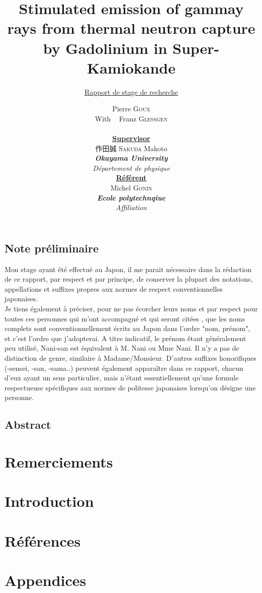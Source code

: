 \documentclass[a4paper,10pt,twoside]{article}
\title{
Stimulated emission of gammay rays from thermal neutron capture by Gadolinium in Super-Kamiokande
}
\subtitle{\underline{Rapport de stage de recherche}}
\author{Pierre \textsc{Goux}\\
\vspace{1em}
With ~ Franz \textsc{Glessgen}\\
\begin{multicols}{2}
\underline{\textbf{\small{Supervisor}}}\\ 作田誠 \textsc{Sakuda} Makoto\\ \textit{\textbf{Okayama University}}\\\textit{ Département de physique}\\
\underline{\textbf{\small{Référent}}}\\ 
Michel \textsc{Gonin}\\ \textit{\textbf{Ecole polytechnqiue}}\\\textit{Affiliation}
\end{multicols}
}
\begin{document}
\maketitle


\subsection*{Note préliminaire}

Mon stage ayant été effectué au Japon, il me parait nécessaire dans la rédaction de ce rapport, par respect et par principe, de conserver la plupart des notations, appellations et suffixes propres aux normes de respect conventionnelles japonaises. \\

Je tiens également à préciser, pour ne pas écorcher leurs noms et par respect pour toutes ces personnes qui m'ont accompagné et qui seront citées , que les noms complets sont conventionnellement écrits au Japon dans l'ordre "nom, prénom", et c'est l'ordre que j'adopterai. 
A titre indicatif, le prénom étant généralement peu utilisé, Nani-san est équivalent à M. Nani ou Mme Nani. Il n'y a pas de distinction de genre, similaire à Madame/Monsieur. D'autres suffixes honorifiques (-sensei, -san, -sama..) peuvent également apparaître dans ce rapport, chacun d'eux ayant un sens particulier, mais n'étant essentiellement qu'une formule respectueuse spécifiques aux normes de politesse japonaises lorsqu'on désigne une personne.\\

\subsection*{Abstract}



\section*{Remerciements}


\newpage
\section*{Introduction}


\tableofcontents


%
%



\listoffigures
\listoftables

\section*{Références}

\printbibliography

\printglossaries

\appendix
\section*{Appendices}

\end{document}
